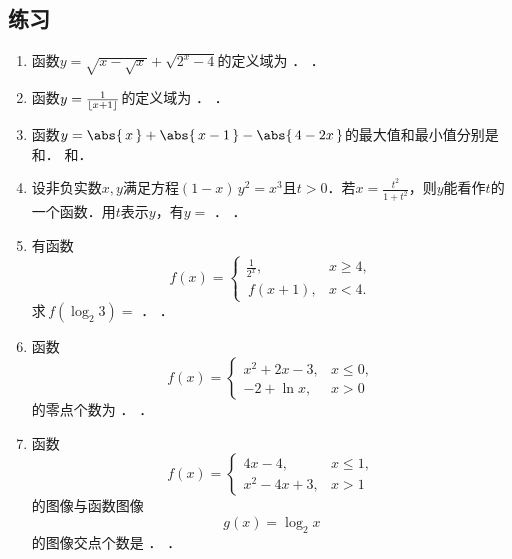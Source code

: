 \subsection*{练习}

\begin{enumerate}
\item 函数\(y = \sqrt{x - \sqrt{x}} + \sqrt{2^x - 4}\)的定义域为
  \ifshowsol
    \uline{}．
  \else
    \uline{\makebox[5em]{}}．
  \fi

\item 函数\(y = \frac1{\lfloor x+1\rfloor}\)的定义域为
  \ifshowsol
    \uline{}．
  \else
    \uline{\makebox[10em]{}}．
  \fi

\item 函数\(y = \abs{\,x\,} + \abs{\,x-1\,} - \abs{\,4-2x\,}\)的最大值和最小值分别是
  \ifshowsol
    \uline{}和\uline{}．
  \else
    \uline{\makebox[3em]{}}和\uline{\makebox[3em]{}}．
  \fi

\item 设非负实数\(x, y\)满足方程\((1-x)\,y^2 = x^3\)且\(t > 0\)．若\(x = \frac{t^2}{1+t^2}\)，则\(y\)能看作\(t\)的一个函数．用\(t\)表示\(y\)，有\(y =\)
  \ifshowsol
    \uline{}．
  \else
    \uline{\makebox[6em]{}}．
  \fi

\item 有函数
  \[
    f(x) =
    \begin{cases}
      \frac1{2^x}, & x \ge 4, \\
      \,f(x+1), & x < 4.
    \end{cases}
  \]
  求\(\,f(\log_2 3) =\)
  \ifshowsol
    \uline{}．
  \else
    \uline{\makebox[4em]{}}．
  \fi

\item 函数
  \[
    f(x) =
    \begin{cases}
      x^2 + 2x - 3, & x \le 0, \\
      -2 + \ln x, & x > 0
    \end{cases}
  \]
  的零点个数为
  \ifshowsol
    \uline{}．
  \else
    \uline{\makebox[3em]{}}．
  \fi

\item 函数
  \[
    f(x) =
    \begin{cases}
      4x - 4, & x \le 1, \\
      x^2 - 4x + 3, & x > 1
    \end{cases}
  \]
  的图像与函数图像
  \[
    g(x) = \log_2 x
  \]
  的图像交点个数是
  \ifshowsol
    \uline{}．
  \else
    \uline{\makebox[3em]{}}．
  \fi


\end{enumerate}
